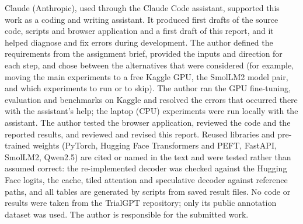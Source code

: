 Claude (Anthropic), used through the Claude Code assistant, supported this work as a coding and writing assistant. It produced first drafts of the source code, scripts and browser application and a first draft of this report, and it helped diagnose and fix errors during development. The author defined the requirements from the assignment brief, provided the inputs and direction for each step, and chose between the alternatives that were considered (for example, moving the main experiments to a free Kaggle GPU, the SmolLM2 model pair, and which experiments to run or to skip). The author ran the GPU fine-tuning, evaluation and benchmarks on Kaggle and resolved the errors that occurred there with the assistant's help; the laptop (CPU) experiments were run locally with the assistant. The author tested the browser application, reviewed the code and the reported results, and reviewed and revised this report. Reused libraries and pre-trained weights (PyTorch, Hugging Face Transformers and PEFT, FastAPI, SmolLM2, Qwen2.5) are cited or named in the text and were tested rather than assumed correct: the re-implemented decoder was checked against the Hugging Face logits, the cache, tiled attention and speculative decoder against reference paths, and all tables are generated by scripts from saved result files. No code or results were taken from the TrialGPT repository; only its public annotation dataset was used. The author is responsible for the submitted work.
